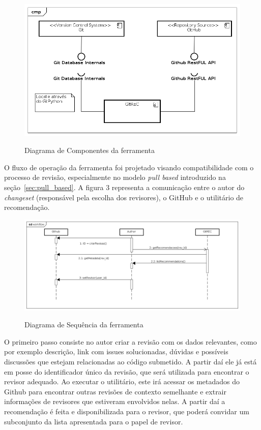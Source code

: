 \documentclass[12pt,openany,oneside,a4paper,english,brazil]{abntbibufjf}
\begin{document}
		\begin{figure}[!htbp]
		 \includegraphics[width=\textwidth]{diagrama_componentes}\label{fig:diagrama_componentes}
		 \caption{Diagrama de Componentes da ferramenta}
	 \end{figure}

   O fluxo de operação da ferramenta foi projetado visando compatibilidade com o processo de revisão, especialmente no modelo \textit{pull based} \cite{gousios2014} introduzido na seção~\ref{sec:pull_based}. A figura 3 representa a comunicação entre o autor do \textit{changeset} (responsável pela escolha dos revisores), o GitHub e o utilitário de recomendação.

   \begin{figure}[!htbp]
    \includegraphics[width=\textwidth]{diagrama_sequencia}\label{fig:diagrama_sequencia}
    \caption{Diagrama de Sequência da ferramenta}
  \end{figure}

  O primeiro passo consiste no autor criar a revisão com os dados relevantes, como por exemplo descrição, link com issues solucionadas, dúvidas e possíveis discussões que estejam relacionadas ao código submetido. A partir daí ele já está em posse do identificador único da revisão, que será utilizada para encontrar o revisor adequado. Ao executar o utilitário, este irá acessar os metadados do Github para encontrar outras revisões de contexto semelhante e extrair informações de revisores que estiveram envolvidos nelas. A partir daí a recomendação é feita e disponibilizada para o revisor, que poderá convidar um subconjunto da lista apresentada para o papel de revisor.
\end{document}
